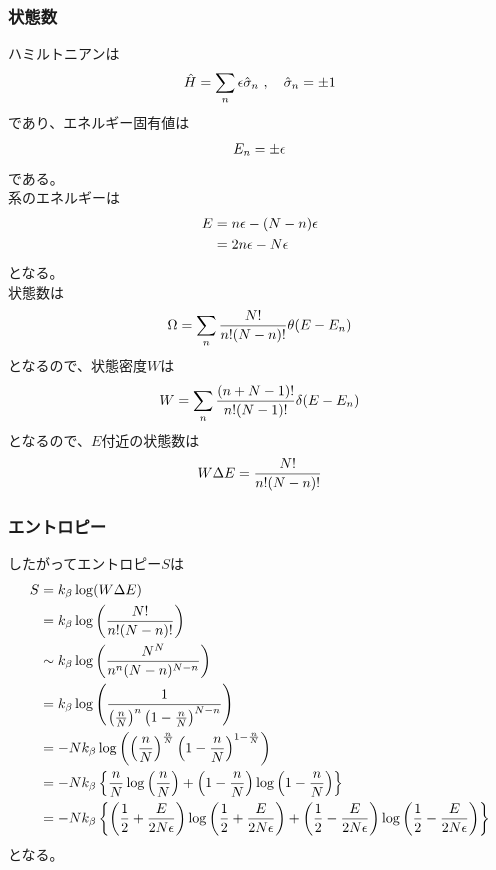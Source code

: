 \documentclass[dvipdfmx, 11pt, a4paper]{jsarticle}
\theoremstyle{definition}
\begin{document}
\subsubsection{状態数}
    ハミルトニアンは
    \begin{align}
        \hat{H} = \sum_n \epsilon \hat{\sigma}_n\ , \quad \hat{\sigma}_n = \pm 1 \notag 
    \end{align}
    であり、エネルギー固有値は
    \begin{align}
        E_n = \pm \epsilon \notag  
    \end{align}
    である。\\
    系のエネルギーは
    \begin{align}
        E &= n\epsilon - (N - n)\epsilon \notag \\
        &= 2n\epsilon - N \epsilon \notag 
    \end{align}
    となる。\\
    状態数は
    \begin{align}
        \Omega = \sum_n \frac{N!}{n!(N-n)!} \theta (E - E_n) \notag 
    \end{align}
    となるので、状態密度$W$は
    \begin{align}
        W = \sum_n \frac{(n+N-1)!}{n!(N-1)!} \delta(E-E_n) \notag 
    \end{align}
    となるので、$E$付近の状態数は
    \begin{align}
        W \Delta E = \frac{N!}{n!(N-n)!} \notag 
    \end{align}
\subsubsection{エントロピー}
    したがってエントロピー$S$は
    \begin{align}
        S &= k_\beta \log(W \Delta E) \notag \\
        &= k_\beta \log \left( \frac{N!}{n!(N-n)!} \right) \notag \\
        &\sim k_\beta \log \left( \frac{N^N}{n^n (N -n)^{N-n}} \right) \notag \\
        &= k_\beta \log \left( \frac{1}{\left( \frac{n}{N} \right)^n \left( 1 - \frac{n}{N} \right)^{N-n}} \right) \notag \\
        &= -Nk_\beta \log \left( \left( \frac{n}{N} \right)^\frac{n}{N} \left( 1 - \frac{n}{N} \right)^{1-\frac{n}{N}} \right) \notag \\
        &= -Nk_\beta \left\{ \frac{n}{N} \log \left( \frac{n}{N} \right) + \left( 1 - \frac{n}{N} \right) \log \left( 1 - \frac{n}{N} \right) \right\} \notag \\
        &= -Nk_\beta \left\{ \left( \frac{1}{2} + \frac{E}{2N\epsilon} \right) \log \left( \frac{1}{2} + \frac{E}{2N\epsilon} \right) + \left( \frac{1}{2} - \frac{E}{2N\epsilon} \right) \log \left( \frac{1}{2} - \frac{E}{2N\epsilon} \right) \right\} \notag 
    \end{align}
    となる。
\end{document}
